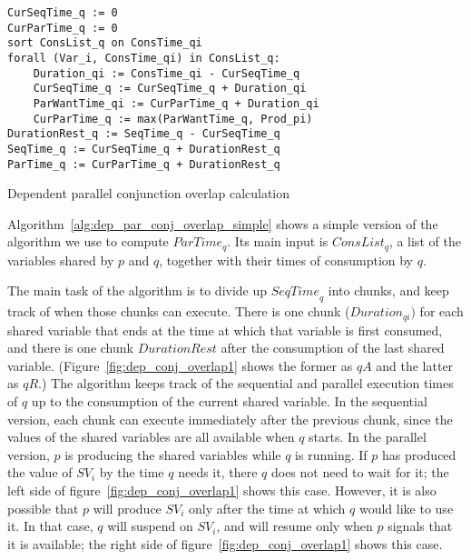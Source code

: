 

\begin{algorithm}
\begin{verbatim}
CurSeqTime_q := 0
CurParTime_q := 0
sort ConsList_q on ConsTime_qi
forall (Var_i, ConsTime_qi) in ConsList_q:
    Duration_qi := ConsTime_qi - CurSeqTime_q
    CurSeqTime_q := CurSeqTime_q + Duration_qi
    ParWantTime_qi := CurParTime_q + Duration_qi
    CurParTime_q := max(ParWantTime_q, Prod_pi)
DurationRest_q := SeqTime_q - CurSeqTime_q
SeqTime_q := CurSeqTime_q + DurationRest_q
ParTime_q := CurParTime_q + DurationRest_q
\end{verbatim}
\caption{Dependent parallel conjunction overlap calculation}
\label{alg:dep_par_conj_overlap_simple}
\end{algorithm}

Algorithm~\ref{alg:dep_par_conj_overlap_simple} shows
a simple version of the algorithm we use to compute ${ParTime}_q$.
Its main input is ${ConsList}_q$,
a list of the variables shared by $p$ and $q$,
together with their times of consumption by $q$.

The main task of the algorithm is to divide up ${SeqTime}_q$ into chunks,
and keep track of when those chunks can execute.
There is one chunk (${Duration}_{qi})$ for each shared variable
that ends at the time at which that variable is first consumed,
and there is one chunk ${DurationRest}$
after the consumption of the last shared variable.
(Figure~\ref{fig:dep_conj_overlap1}
shows the former as ${qA}$ and the latter as ${qR}$.)
The algorithm keeps track of the sequential and parallel execution times of $q$
up to the consumption of the current shared variable.
In the sequential version,
each chunk can execute immediately after the previous chunk,
since the values of the shared variables are all available when $q$ starts.
In the parallel version,
$p$ is producing the shared variables while $q$ is running.
If $p$ has produced the value of ${SV}_i$ by the time $q$ needs it,
there $q$ does not need to wait for it;
the left side of figure~\ref{fig:dep_conj_overlap1} shows this case.
However, it is also possible that $p$ will produce ${SV}_i$
only after the time at which $q$ would like to use it.
In that case, $q$ will suspend on ${SV}_i$,
and will resume only when $p$ signals that it is available;
the right side of figure~\ref{fig:dep_conj_overlap1} shows this case.

